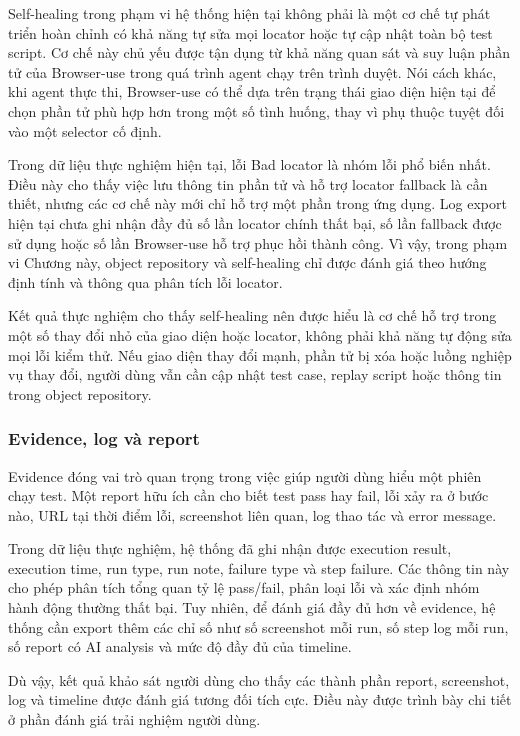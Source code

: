 Self-healing trong phạm vi hệ thống hiện tại không phải là một cơ chế tự phát triển hoàn chỉnh có khả năng tự sửa mọi locator hoặc tự cập nhật toàn bộ test script. Cơ chế này chủ yếu được tận dụng từ khả năng quan sát và suy luận phần tử của Browser-use trong quá trình agent chạy trên trình duyệt. Nói cách khác, khi agent thực thi, Browser-use có thể dựa trên trạng thái giao diện hiện tại để chọn phần tử phù hợp hơn trong một số tình huống, thay vì phụ thuộc tuyệt đối vào một selector cố định.

Trong dữ liệu thực nghiệm hiện tại, lỗi Bad locator là nhóm lỗi phổ biến nhất. Điều này cho thấy việc lưu thông tin phần tử và hỗ trợ locator fallback là cần thiết, nhưng các cơ chế này mới chỉ hỗ trợ một phần trong ứng dụng. Log export hiện tại chưa ghi nhận đầy đủ số lần locator chính thất bại, số lần fallback được sử dụng hoặc số lần Browser-use hỗ trợ phục hồi thành công. Vì vậy, trong phạm vi Chương này, object repository và self-healing chỉ được đánh giá theo hướng định tính và thông qua phân tích lỗi locator.

Kết quả thực nghiệm cho thấy self-healing nên được hiểu là cơ chế hỗ trợ trong một số thay đổi nhỏ của giao diện hoặc locator, không phải khả năng tự động sửa mọi lỗi kiểm thử. Nếu giao diện thay đổi mạnh, phần tử bị xóa hoặc luồng nghiệp vụ thay đổi, người dùng vẫn cần cập nhật test case, replay script hoặc thông tin trong object repository.

\subsubsection{Evidence, log và report}

Evidence đóng vai trò quan trọng trong việc giúp người dùng hiểu một phiên chạy test. Một report hữu ích cần cho biết test pass hay fail, lỗi xảy ra ở bước nào, URL tại thời điểm lỗi, screenshot liên quan, log thao tác và error message.

Trong dữ liệu thực nghiệm, hệ thống đã ghi nhận được execution result, execution time, run type, run note, failure type và step failure. Các thông tin này cho phép phân tích tổng quan tỷ lệ pass/fail, phân loại lỗi và xác định nhóm hành động thường thất bại. Tuy nhiên, để đánh giá đầy đủ hơn về evidence, hệ thống cần export thêm các chỉ số như số screenshot mỗi run, số step log mỗi run, số report có AI analysis và mức độ đầy đủ của timeline.

Dù vậy, kết quả khảo sát người dùng cho thấy các thành phần report, screenshot, log và timeline được đánh giá tương đối tích cực. Điều này được trình bày chi tiết ở phần đánh giá trải nghiệm người dùng.

